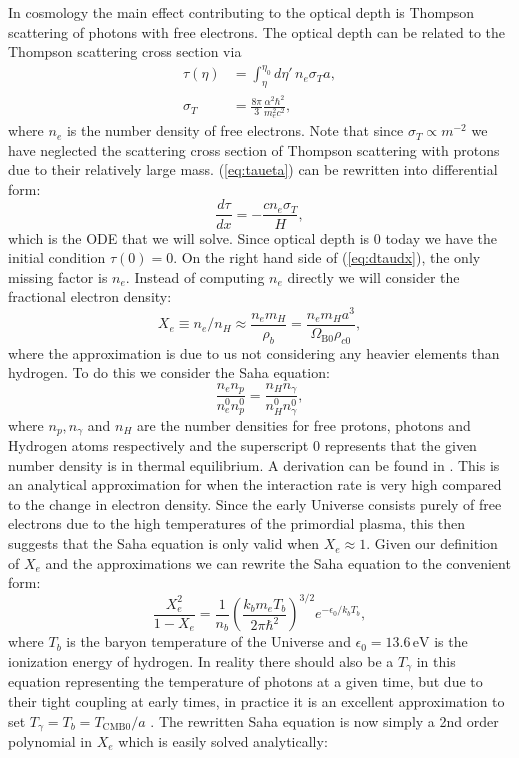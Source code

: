 \documentclass[%
reprint,
 amsmath,amssymb,
 aps,
]{revtex4-2}
\begin{document}
In cosmology the main effect contributing to the optical depth is Thompson scattering of photons with free electrons. The optical depth can be related to the Thompson scattering cross section via
\begin{align}
	\tau(\eta)&=\int_\eta^{\eta_0}d\eta'\,n_e\sigma_Ta,
	\label{eq:taueta}\\
	\sigma_T&=\frac{8\pi}{3}\frac{\alpha^2\hbar^2}{m_e^2c^2},\nonumber
\end{align}
where $n_e$ is the number density of free electrons. Note that since $\sigma_T\propto m^{-2}$ we have neglected the scattering cross section of Thompson scattering with protons due to their relatively large mass. (\ref{eq:taueta}) can be rewritten into differential form:
\begin{equation}
	\frac{d\tau}{dx}=-\frac{cn_e\sigma_T}{H}, \label{eq:dtaudx}
\end{equation}
which is the ODE that we will solve. Since optical depth is $0$ today we have the initial condition $\tau(0)=0$. On the right hand side of (\ref{eq:dtaudx}), the only missing factor is $n_e$. Instead of computing $n_e$ directly we will consider the fractional electron density:
\[X_e\equiv n_e/n_H\approx\frac{n_em_H}{\rho_b}=\frac{n_em_Ha^3}{\Omega_{\text{B}0}\rho_{c0}},\]
where the approximation is due to us not considering any heavier elements than hydrogen. To do this we consider the Saha equation:
\[\frac{n_en_p}{n_e^{0}n_p^{0}}=\frac{n_Hn_\gamma}{n_H^{0}n_\gamma^{0}},\]
where $n_p,n_\gamma$ and $n_H$ are the number densities for free protons, photons and Hydrogen atoms respectively and the superscript $0$ represents that the given number density is in thermal equilibrium. A derivation can be found in \cite{Dodelson:2003ft}. This is an analytical approximation for when the interaction rate is very high compared to the change in electron density. Since the early Universe consists purely of free electrons due to the high temperatures of the primordial plasma, this then suggests that the Saha equation is only valid when $X_e\approx 1$. Given our definition of $X_e$ and the approximations we can rewrite the Saha equation to the convenient form:
\begin{equation}
	\frac{X_e^2}{1-X_e}=\frac{1}{n_b}\left(\frac{k_bm_eT_b}{2\pi\hbar^2}\right)^{3/2}e^{-\epsilon_0/k_bT_b},
\end{equation}
where $T_b$ is the baryon temperature of the Universe and $\epsilon_0=13.6\,\text{eV}$ is the ionization energy of hydrogen. In reality there should also be a $T_\gamma$ in this equation representing the temperature of photons at a given time, but due to their tight coupling at early times, in practice it is an excellent approximation to set $T_\gamma=T_b=T_{\text{CMB}0}/a$ \cite{AST5220LectureNotes}. The rewritten Saha equation is now simply a 2nd order polynomial in $X_e$ which is easily solved analytically:
\end{document}
